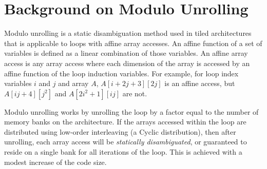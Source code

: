 \section{Background on Modulo Unrolling}\label{sec:modulo_unrolling}

Modulo unrolling \cite{barua1999maps} is a static disambiguation method used in tiled architectures that is applicable to loops with affine array accesses. An affine function of a set of variables is defined as a linear combination of those variables. An affine array access is any array access where each dimension of the array is accessed by an affine function of the loop induction variables. For example, for loop index variables $i$ and $j$ and array $A$, $A[i+2j+3][2j]$ is an affine access, but $A[ij+4][j^2]$ and $A[2i^2+1][ij]$ are not. 

Modulo unrolling works by unrolling the loop by a factor equal to the number of memory banks on the architecture. If the arrays accessed within the loop are distributed using low-order interleaving (a Cyclic distribution), then after unrolling, each array access will be \textit{statically disambiguated}, or guaranteed to reside on a single bank for all iterations of the loop. This is achieved with a modest increase of the code size. 


